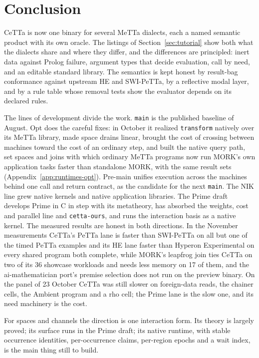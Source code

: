 \documentclass[11pt]{article}
\newcommand{\code}[1]{\texttt{#1}}
\newcommand{\PeTTa}{\textup{PeTTa}}
\newcommand{\HE}{\textup{HE}}
\newcommand{\CeTTa}{\textup{CeTTa}}
\begin{document}
\section{Conclusion}
\label{sec:conclusion}

\CeTTa{} is now one binary for several MeTTa dialects, each a named semantic
product with its own oracle.  The listings of Section~\ref{sec:tutorial} show
both what the dialects share and where they differ, and the differences are
principled: inert data against Prolog failure, argument types that decide
evaluation, call by need, and an editable standard library.  The semantics is
kept honest by result-bag conformance against upstream \HE{} and
SWI-\PeTTa{}, by a reflective modal layer, and by a rule table whose removal
tests show the evaluator depends on its declared rules.

The lines of development divide the work.  \code{main} is the published
baseline of August.  Opt does the careful fixes: in October it realized
\code{transform} natively over its MeTTa library, made space drains linear,
brought the cost of crossing between machines toward the cost of an ordinary
step, and built the native query path, set spaces and joins with which
ordinary MeTTa programs now run MORK's own application tasks faster than
standalone MORK, with the same result sets (Appendix~\ref{app:runtimes-opt}).  Pre-main unifies execution across the machines behind one call and
return contract, as the candidate for the next \code{main}.  The NIK line
grew native kernels and native application libraries.  The Prime draft
develops Prime in C in step with its metatheory, has absorbed the weights,
cost and parallel line and \code{cetta-ours}, and runs the interaction basis
as a native kernel.  The measured results are honest in both directions.  In
the November measurements \CeTTa{}'s \PeTTa{} lane is faster than
SWI-\PeTTa{} on all but one of the timed \PeTTa{} examples and its \HE{} lane
faster than Hyperon Experimental on every shared program both complete, while
MORK's leapfrog join ties \CeTTa{} on two of its 36 showcase workloads and
needs less memory on 17 of them, and the ai-mathematician port's premise selection does not
run on the preview binary.  On the panel of 23 October \CeTTa{} was still
slower on foreign-data reads, the chainer cells, the Ambient program and a rho
cell; the Prime lane is the slow one, and its need machinery is the cost.

For spaces and channels the direction is one interaction form.  Its theory is
largely proved; its surface runs in the Prime draft; its native runtime, with
stable occurrence identities, per-occurrence claims, per-region epochs and a
wait index, is the main thing still to build.
\end{document}
